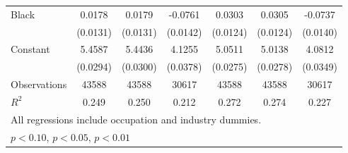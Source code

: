{\begin{longtable}{l*{6}{c}}
Black               &      0.0178         &      0.0179         &     -0.0761\sym{***}&      0.0303\sym{**} &      0.0305\sym{**} &     -0.0737\sym{***}\\
                    &    (0.0131)         &    (0.0131)         &    (0.0142)         &    (0.0124)         &    (0.0124)         &    (0.0140)         \\
Constant            &      5.4587\sym{***}&      5.4436\sym{***}&      4.1255\sym{***}&      5.0511\sym{***}&      5.0138\sym{***}&      4.0812\sym{***}\\
                    &    (0.0294)         &    (0.0300)         &    (0.0378)         &    (0.0275)         &    (0.0278)         &    (0.0349)         \\
\hline  
Observations        &       43588         &       43588         &       30617         &       43588         &       43588         &       30617         \\
\(R^{2}\)           &       0.249         &       0.250         &       0.212         &       0.272         &       0.274         &       0.227         \\
\hline  
\multicolumn{7}{l}{\footnotesize All regressions include occupation and industry dummies.}\\
\multicolumn{7}{l}{\footnotesize \sym{*} \(p<0.10\), \sym{**} \(p<0.05\), \sym{***} \(p<0.01\)}\\
\end{longtable}
}
